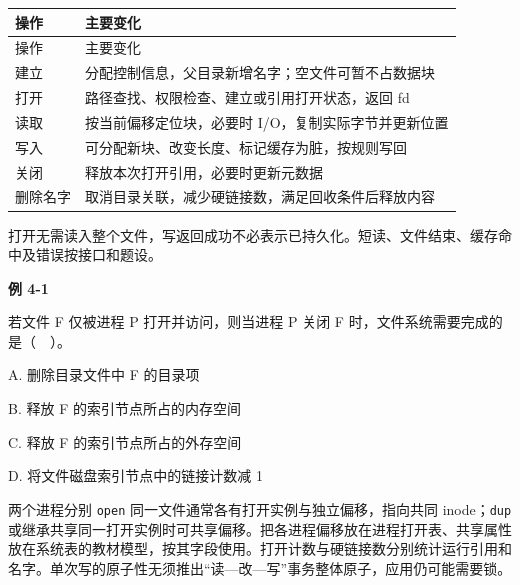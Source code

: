 \par\smallskip
{\fontsize{9.3}{12}\selectfont\setlength{\tabcolsep}{2.5pt}\setlength{\LTleft}{0pt}\setlength{\LTright}{0pt}
\begin{longtable}{@{}>{\raggedright\arraybackslash}p{}>{\raggedright\arraybackslash}p{}@{}}
\toprule
操作 & 主要变化 \\

\midrule\endfirsthead\toprule
操作 & 主要变化 \\

\midrule\endhead\bottomrule\endfoot
建立 & 分配控制信息，父目录新增名字；空文件可暂不占数据块 \\

打开 & 路径查找、权限检查、建立或引用打开状态，返回 fd \\

读取 & 按当前偏移定位块，必要时 I/O，复制实际字节并更新位置 \\

写入 & 可分配新块、改变长度、标记缓存为脏，按规则写回 \\

关闭 & 释放本次打开引用，必要时更新元数据 \\

删除名字 & 取消目录关联，减少硬链接数，满足回收条件后释放内容 \\

\end{longtable}}
\par\smallskip

打开无需读入整个文件，写返回成功不必表示已持久化。短读、文件结束、缓存命中及错误按接口和题设。

\par\medskip{}\noindent\hypertarget{OS04-E01}{}\label{OS04-E01}\textbf{例 4-1}\par\nobreak\smallskip

若文件 F 仅被进程 P 打开并访问，则当进程 P 关闭 F 时，文件系统需要完成的是（　）。

A. 删除目录文件中 F 的目录项

B. 释放 F 的索引节点所占的内存空间

C. 释放 F 的索引节点所占的外存空间

D. 将文件磁盘索引节点中的链接计数减 1

两个进程分别 \texttt{open} 同一文件通常各有打开实例与独立偏移，指向共同 inode；\texttt{dup} 或继承共享同一打开实例时可共享偏移。把各进程偏移放在进程打开表、共享属性放在系统表的教材模型，按其字段使用。打开计数与硬链接数分别统计运行引用和名字。单次写的原子性无须推出``读---改---写''事务整体原子，应用仍可能需要锁。

